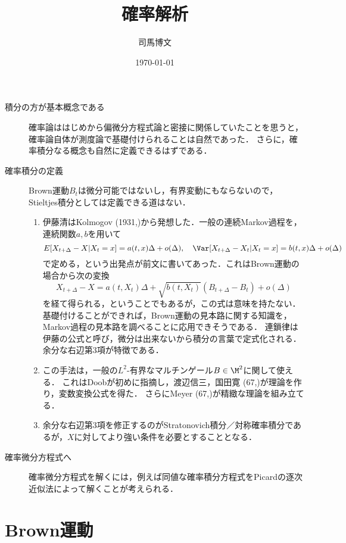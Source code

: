 \documentclass[uplatex,dvipdfmx]{jsreport}
\title{確率解析}
\author{司馬博文}
\date{\today}
\begin{document}
\tableofcontents

\begin{tcolorbox}[colframe=ForestGreen, colback=ForestGreen!10!white,breakable,colbacktitle=ForestGreen!40!white,coltitle=black,fonttitle=\bfseries\sffamily,
title=Brown運動を駆動過程とした確率解析を導入し，適宜一般化する．]
    \begin{description}
        \item[積分の方が基本概念である] 確率論ははじめから偏微分方程式論と密接に関係していたことを思うと，確率論自体が測度論で基礎付けられることは自然であった．
        さらに，確率積分なる概念も自然に定義できるはずである．
        \item[確率積分の定義] Brown運動$B_t$は微分可能ではないし，有界変動にもならないので，Stieltjes積分としては定義できる道はない．
        \begin{enumerate}
            \item 伊藤清はKolmogov (1931,\cite{Kolmogorov-31})から発想した．一般の連続Markov過程を，連続関数$a,b$を用いて
            \[E[X_{t+\Delta}-X|X_t=x]=a(t,x)\Delta+o(\Delta),\quad \Var[X_{t+\Delta}-X_t|X_t=x]=b(t,x)\Delta+o(\Delta)\]
            で定める，という出発点が前文に書いてあった．これはBrown運動の場合から次の変換
            \[X_{t+\Delta}-X=a(t,X_t)\Delta+\sqrt{b(t,X_t)}(B_{t+\Delta}-B_t)+o(\Delta)\]
            を経て得られる，ということでもあるが，この式は意味を持たない．基礎付けることができれば，Brown運動の見本路に関する知識を，Markov過程の見本路を調べることに応用できそうである．
            連鎖律は伊藤の公式と呼び，微分は出来ないから積分の言葉で定式化される．余分な右辺第3項が特徴である．
            \item この手法は，一般の$L^2$-有界なマルチンゲール$B\in\M^2$に関して使える．
            これはDoobが初めに指摘し，渡辺信三，国田寛 (67,\cite{Kunita-Watanabe})が理論を作り，変数変換公式を得た．
            さらにMeyer (67,\cite{Meyer-Seminaire})が精緻な理論を組み立てる．
            \item 余分な右辺第3項を修正するのがStratonovich積分／対称確率積分であるが，$X$に対してより強い条件を必要とすることとなる．
        \end{enumerate}
        \item[確率微分方程式へ] 確率微分方程式を解くには，例えば同値な確率積分方程式をPicardの逐次近似法によって解くことが考えられる．
    \end{description}
\end{tcolorbox}

\chapter{Brown運動}
\end{document}
